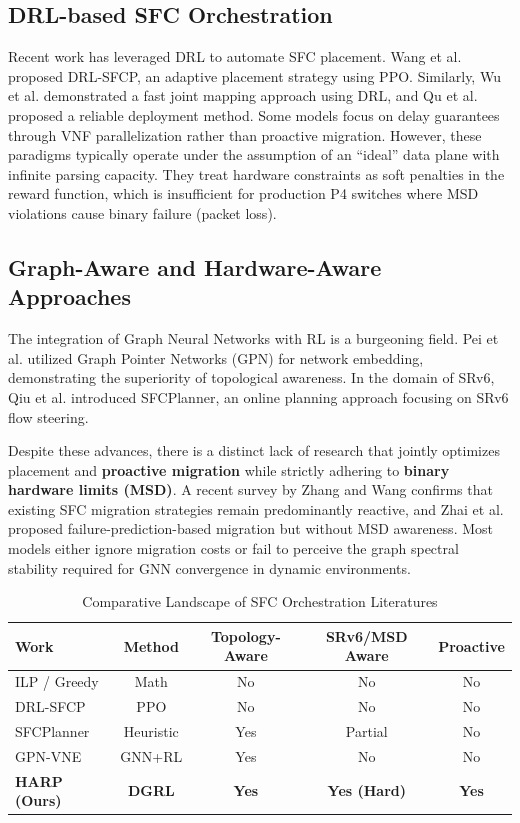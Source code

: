 \documentclass[12pt, a4paper, reqno, oneside]{book}
\begin{document}
\subsection{DRL-based SFC Orchestration}
Recent work has leveraged DRL to automate SFC placement. Wang et al. \cite{wang2021drl} proposed DRL-SFCP, an adaptive placement strategy using PPO. Similarly, Wu et al. \cite{wu2025drl} demonstrated a fast joint mapping approach using DRL, and Qu et al. \cite{qu2021reliable} proposed a reliable deployment method. Some models focus on delay guarantees through VNF parallelization \cite{liu2025delay} rather than proactive migration. However, these paradigms typically operate under the assumption of an ``ideal'' data plane with infinite parsing capacity. They treat hardware constraints as soft penalties in the reward function, which is insufficient for production P4 switches where MSD violations cause binary failure (packet loss).

\subsection{Graph-Aware and Hardware-Aware Approaches}
The integration of Graph Neural Networks with RL is a burgeoning field. Pei et al. \cite{pei2025graph} utilized Graph Pointer Networks (GPN) for network embedding, demonstrating the superiority of topological awareness. In the domain of SRv6, Qiu et al. \cite{qiu2024sfcplanner} introduced SFCPlanner, an online planning approach focusing on SRv6 flow steering. 

Despite these advances, there is a distinct lack of research that jointly optimizes placement and \textbf{proactive migration} while strictly adhering to \textbf{binary hardware limits (MSD)}. A recent survey by Zhang and Wang \cite{zhang2025sfcmigration} confirms that existing SFC migration strategies remain predominantly reactive, and Zhai et al. \cite{zhai2023migration} proposed failure-prediction-based migration but without MSD awareness. Most models either ignore migration costs or fail to perceive the graph spectral stability required for GNN convergence in dynamic environments.

\begin{table}[H]
\centering
\caption{Comparative Landscape of SFC Orchestration Literatures}
\label{table:literature_comparison}
\begin{tabular}{lcccc}
\toprule
\textbf{Work} & \textbf{Method} & \textbf{Topology-Aware} & \textbf{SRv6/MSD Aware} & \textbf{Proactive} \\
\midrule
ILP / Greedy & Math & No & No & No \\
DRL-SFCP \cite{wang2021drl} & PPO & No & No & No \\
SFCPlanner \cite{qiu2024sfcplanner} & Heuristic & Yes & Partial & No \\
GPN-VNE \cite{pei2025graph} & GNN+RL & Yes & No & No \\
\textbf{HARP (Ours)} & \textbf{DGRL} & \textbf{Yes} & \textbf{Yes (Hard)} & \textbf{Yes} \\
\bottomrule
\end{tabular}
\end{table}
\end{document}
